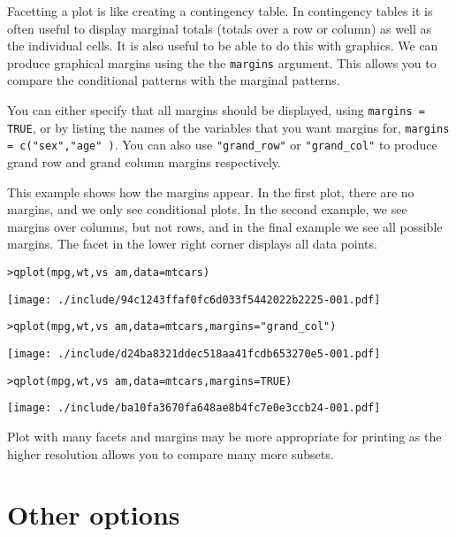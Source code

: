 Facetting a plot is like creating a contingency table.  In contingency tables it is often useful to display marginal totals (totals over a row or column) as well as the individual cells.  It is also useful to be able to do this with graphics.  We can produce graphical margins using the the {\tt margins} argument.  This allows you to compare the conditional patterns with the marginal patterns.

You can either specify that all margins should be displayed, using {\tt margins = TRUE}, or by listing the names of the variables that you want margins for, {\tt margins = c("sex","age" )}.  You can also use \verb|"grand_row"| or \verb|"grand_col"| to produce grand row and grand column margins respectively.

This example shows how the margins appear.  In the first plot, there are no margins, and we only see conditional plots.  In the second example, we see margins over columns, but not rows, and in the final example we see all possible margins.  The facet in the lower right corner displays all data points.

\begin{alltt}
> qplot(mpg, wt, vs ~ am, data = mtcars)
\end{alltt}
\texttt{[image: ./include/94c1243ffaf0fc6d033f5442022b2225-001.pdf]}
\begin{alltt}

> qplot(mpg, wt, vs ~ am, data = mtcars, margins = "grand_col")
\end{alltt}
\texttt{[image: ./include/d24ba8321ddec518aa41fcdb653270e5-001.pdf]}
\begin{alltt}

> qplot(mpg, wt, vs ~ am, data = mtcars, margins = TRUE)
\end{alltt}
\texttt{[image: ./include/ba10fa3670fa648ae8b4fc7e0e3ccb24-001.pdf]}
\begin{alltt}

\end{alltt}

Plot with many facets and margins may be more appropriate for printing as the higher resolution allows you to compare many more subsets.

\section{Other options}\label{sec:other_options}


